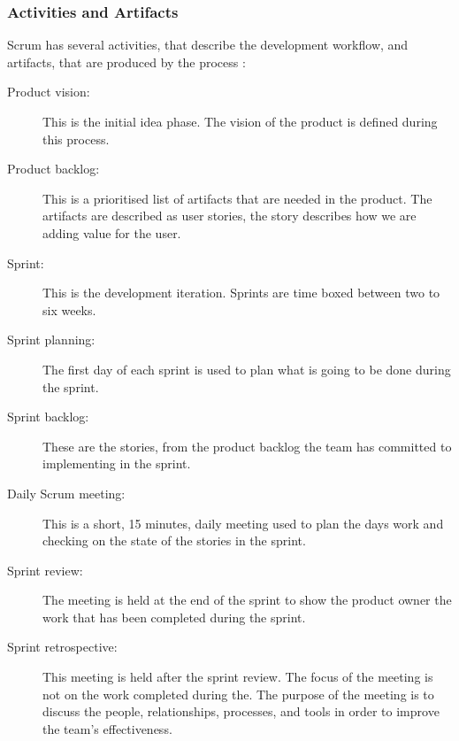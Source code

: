 \subsubsection{Activities and Artifacts}
Scrum has several activities, that describe the development workflow, and artifacts,
that are produced by the process \parencite{ScrumGoesFormal}:
\begin{description}
	\item [Product vision:] This is the initial idea phase. The vision of the 
		product is defined during this process.
	\item [Product backlog:] This is a prioritised list of artifacts that are needed
		in the product. The artifacts are described as user stories, the story describes
		how we are adding value for the user.
	\item [Sprint:] This is the development iteration. Sprints are time boxed between
		 two to six weeks.
	\item [Sprint planning:] The first day of each sprint is used to plan what is
		going to be done during the sprint.
	\item [Sprint backlog:] These are the stories, from the product backlog the team
		has committed to implementing in the sprint.
	\item [Daily Scrum meeting:] This is a short, 15 minutes, daily meeting used to plan
		the days work and checking on the state of the stories in the sprint.
	\item [Sprint review:] The meeting is held at the end of the sprint to show the 
		product owner the work that has been completed during the sprint.
	\item [Sprint retrospective:] This meeting is held after the sprint review. The 
		focus of the meeting is not on the work completed during the. The purpose
		of the meeting is to discuss the people, relationships, processes, and tools 
		in order to improve the team's effectiveness.
\end{description}

